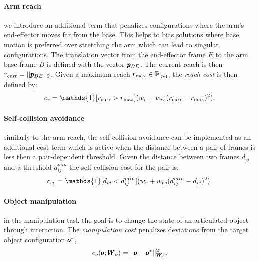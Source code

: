  \paragraph{Arm reach} we introduce an additional term that penalizes configurations where the arm's end-effector moves far from the base. This helps to bias solutions where base motion is preferred over stretching the arm which can lead to singular configurations. The translation vector from the end-effector frame $E$ to the arm base frame $B$ is defined with the vector $\pmb{p}_{BE}$. The current reach is then $r_{\text{curr}} = || \pmb{p}_{BE} ||_2$. Given a maximum reach $r_{\text{max}} \in \mathbb{R}^{}_{\geq 0}$, the \textit{reach cost} is then defined by:
 \begin{equation}
   c_r = \mathds{1}[r_{\text{curr}} > r_{\text{max}}] (\weightScalar{r} + \weightScalar{rs}(r_{\text{curr}} - r_{\text{max}})^2),    
 \end{equation}

 \paragraph{Self-collision avoidance} similarly to the arm reach, the self-collision avoidance can be implemented as an additional cost term which is active when the distance between a pair of frames is less then a pair-dependent threshold. Given the distance between two frames $d_{ij}$ and a threshold $d^{min}_{ij}$ the self-collision cost for the pair is:
 \begin{equation}
   c_{sc} = \mathds{1}[d_{ij} < d^{min}_{ij}] (\weightScalar{r} + \weightScalar{rs}(d^{min}_{ij} - d_{ij})^2).    
 \end{equation}
 
 \paragraph{Object manipulation} in the manipulation task the goal is to change the state of an articulated object through interaction. The \textit{manipulation cost} penalizes deviations from the target object configuration $\pmb{o}^{*}$,
\begin{equation}
    c_o(\pmb{o}; \pmb{W}_{o}) = || \pmb{o} - \pmb{o}^{*}||^2_{\pmb{W}_{o}}.
\end{equation}
